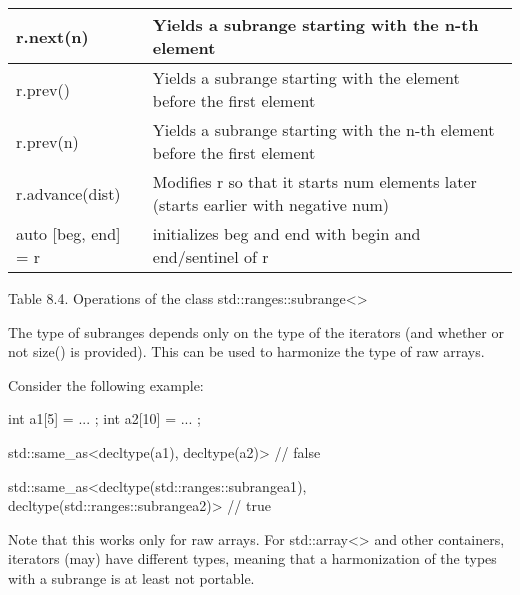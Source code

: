 \begin{longtable}[c]{|l|l|}
r.next(n)               & Yields a subrange starting with the n-th element                          \\ \hline
r.prev()                & Yields a subrange starting with the element before the first element      \\ \hline
r.prev(n)               & Yields a subrange starting with the n-th element before the first element \\ \hline
r.advance(dist)                & Modifies r so that it starts num elements later (starts earlier with negative num)                       \\ \hline
auto {[}beg, end{]} = r & initializes beg and end with begin and end/sentinel of r                  \\ \hline
\end{longtable}

\begin{center}
Table 8.4. Operations of the class std::ranges::subrange<>
\end{center}


The type of subranges depends only on the type of the iterators (and whether or not size() is provided).
This can be used to harmonize the type of raw arrays.

Consider the following example:

\begin{cpp}
int a1[5] = { ... };
int a2[10] = { ... };

std::same_as<decltype(a1), decltype(a2)> // false

std::same_as<decltype(std::ranges::subrange{a1}),
			 decltype(std::ranges::subrange{a2})> // true
\end{cpp}

Note that this works only for raw arrays. For std::array<> and other containers, iterators (may) have different types, meaning that a harmonization of the types with a subrange is at least not portable.


